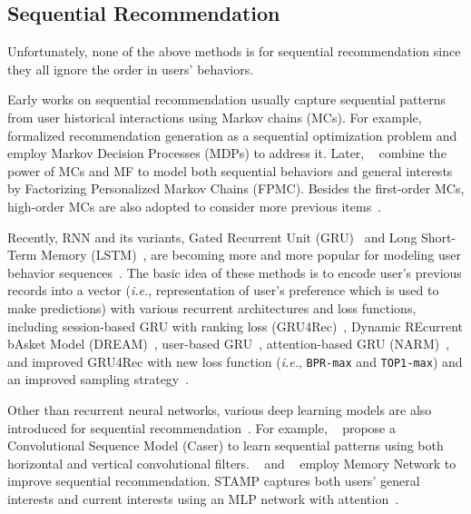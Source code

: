 \subsection{Sequential Recommendation}

Unfortunately, none of the above methods is for sequential recommendation since they all ignore the order in users' behaviors.

Early works on sequential recommendation usually capture sequential patterns from user historical interactions using Markov chains (MCs).
For example, \citeauthor{Shani:jmlr2005:MRS}~\cite{Shani:jmlr2005:MRS} formalized recommendation generation as a sequential optimization problem and employ Markov Decision Processes (MDPs) to address it. 
Later, \citeauthor{Rendle:WWW2010:FPM}~\cite{Rendle:WWW2010:FPM} combine the power of MCs and MF to model both sequential behaviors and general interests by Factorizing Personalized Markov Chains (FPMC).
Besides the first-order MCs, high-order MCs are also adopted to  consider more previous items~\cite{He:icdm16:Fusing,He:recsys2017:TR}. 
 
Recently, RNN and its variants, Gated Recurrent Unit (GRU)~\cite{Cho:emnlp2014:gru} and Long Short-Term Memory (LSTM)~\cite{Hochreiter:LSTM:NC1997}, are becoming more and more popular for modeling user behavior sequences~\cite{Hidasi:ICLR2016:gru4rec,Yu:sigir2016:DRM,Wu:wsdm2017:RRN,Donkers:recsys2017:SUR,Quadrana:recsys2017:PSR,Li:cikm2017:NAS,Hidasi:CIKM2018:RNN}.
The basic idea of these methods is to encode user's previous records into a vector (\textit{i.e.}, representation of user's preference which is used to make predictions) with various recurrent architectures and loss functions, including session-based GRU with ranking loss (GRU4Rec)~\cite{Hidasi:ICLR2016:gru4rec}, Dynamic REcurrent bAsket Model (DREAM)~\cite{Yu:sigir2016:DRM}, user-based GRU~\cite{Donkers:recsys2017:SUR}, attention-based GRU (NARM)~\cite{Li:cikm2017:NAS}, and improved GRU4Rec with new loss function (\textit{i.e.}, \texttt{BPR-max} and \texttt{TOP1-max}) and an improved sampling strategy~\cite{Hidasi:CIKM2018:RNN}.



Other than recurrent neural networks, various deep learning models are also introduced for sequential recommendation~\cite{Chen:wsdm2018:SRU,Tang:WSDM2018:caser,Liu:kdd2018:STAMP,Kang:ICDM2018:SAS}. %
For example, \citeauthor{Tang:WSDM2018:caser}~\cite{Tang:WSDM2018:caser} propose a Convolutional Sequence  Model (Caser) to learn sequential patterns using both horizontal and vertical convolutional filters.
\citeauthor{Chen:wsdm2018:SRU}~\cite{Chen:wsdm2018:SRU} and \citeauthor{Huang:sigir2018:ISR}~\cite{Huang:sigir2018:ISR} employ Memory Network to improve sequential recommendation.
STAMP captures both users' general interests and current interests using an MLP network with attention~\cite{Liu:kdd2018:STAMP}.

